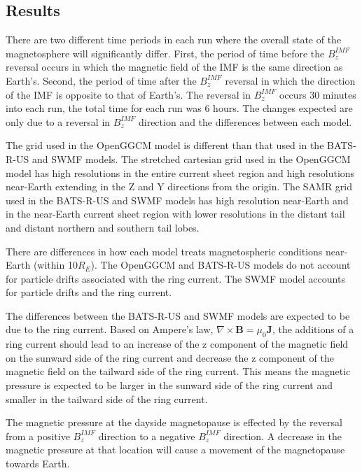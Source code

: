 \subsection{Results}

There are two different time periods in each run where the overall state of the
magnetosphere will significantly differ. First, the period of time before the
$B_z^{IMF}$ reversal occurs in which the magnetic field of the IMF is the same
direction as Earth's. Second, the period of time after the $B_z^{IMF}$ reversal
in which the direction of the IMF is opposite to that of Earth's. The reversal in $B_z^{IMF}$ occurs 30 minutes into each
run, the total time for each run was 6 hours. The changes expected are only due
to a reversal in $B_z^{IMF}$ direction and the differences between each model.

The grid used in the OpenGGCM model is different than that used in the BATS-R-US and SWMF models.
The stretched cartesian grid used in the OpenGGCM model has high resolutions in the
entire current sheet region and high resolutions near-Earth extending in the
Z and Y directions from the origin. The SAMR grid used in the BATS-R-US and SWMF models
has high resolution near-Earth and in the near-Earth current sheet region with
lower resolutions in the distant tail and distant northern and southern tail
lobes.

There are differences in how each model treats magnetospheric conditions
near-Earth (within 10$R_E$). The OpenGGCM and BATS-R-US models do not account
for particle drifts associated with the ring current. The SWMF model accounts
for particle drifts and the ring current.

The differences between the BATS-R-US and SWMF models are expected to be due to
the ring current. Based on Ampere's law, $\nabla \times \mathbf{B} =
\mu_0 \mathbf{J}$, the additions of a ring current should lead to an increase
of the z component of the magnetic field on the sunward side of the ring current
and decrease the z component of the magnetic field on the tailward side of
the ring current. This means the magnetic pressure is expected to be larger in
the sunward side of the ring current and smaller in the tailward side of the
ring current.

The magnetic pressure at the dayside magnetopause is effected by the reversal
from a positive $B_z^{IMF}$ direction to a negative $B_z^{IMF}$ direction. A
decrease in the magnetic pressure at that location will cause a movement of the
magnetopause towards Earth.

